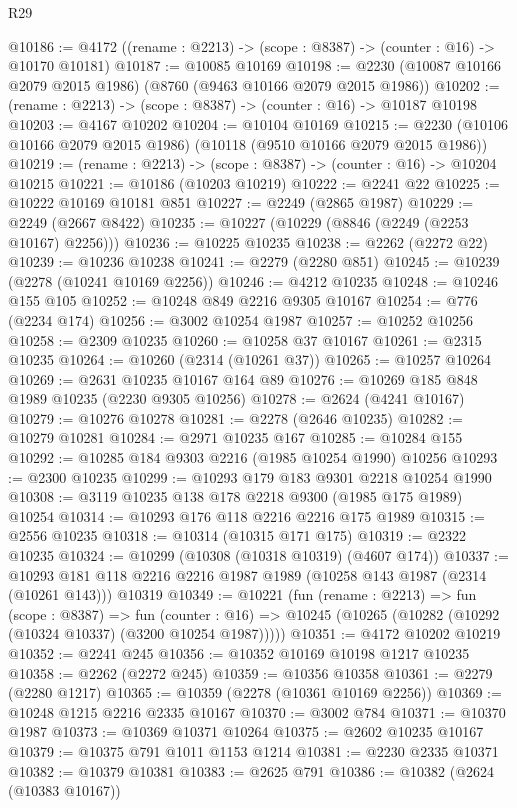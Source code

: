 \begin{lexlean}{R29}
\begin{coremodule}
@10186 := @4172 ((rename : @2213) -> (scope : @8387) -> (counter : @16) -> @10170 @10181)
@10187 := @10085 @10169
@10198 := @2230 (@10087 @10166 @2079 @2015 @1986) (@8760 (@9463 @10166 @2079 @2015 @1986))
@10202 := (rename : @2213) -> (scope : @8387) -> (counter : @16) -> @10187 @10198
@10203 := @4167 @10202
@10204 := @10104 @10169
@10215 := @2230 (@10106 @10166 @2079 @2015 @1986) (@10118 (@9510 @10166 @2079 @2015 @1986))
@10219 := (rename : @2213) -> (scope : @8387) -> (counter : @16) -> @10204 @10215
@10221 := @10186 (@10203 @10219)
@10222 := @2241 @22
@10225 := @10222 @10169 @10181 @851
@10227 := @2249 (@2865 @1987)
@10229 := @2249 (@2667 @8422)
@10235 := @10227 (@10229 (@8846 (@2249 (@2253 @10167) @2256)))
@10236 := @10225 @10235
@10238 := @2262 (@2272 @22)
@10239 := @10236 @10238
@10241 := @2279 (@2280 @851)
@10245 := @10239 (@2278 (@10241 @10169 @2256))
@10246 := @4212 @10235
@10248 := @10246 @155 @105
@10252 := @10248 @849 @2216 @9305 @10167
@10254 := @776 (@2234 @174)
@10256 := @3002 @10254 @1987
@10257 := @10252 @10256
@10258 := @2309 @10235
@10260 := @10258 @37 @10167
@10261 := @2315 @10235
@10264 := @10260 (@2314 (@10261 @37))
@10265 := @10257 @10264
@10269 := @2631 @10235 @10167 @164 @89
@10276 := @10269 @185 @848 @1989 @10235 (@2230 @9305 @10256)
@10278 := @2624 (@4241 @10167)
@10279 := @10276 @10278
@10281 := @2278 (@2646 @10235)
@10282 := @10279 @10281
@10284 := @2971 @10235 @167
@10285 := @10284 @155
@10292 := @10285 @184 @9303 @2216 (@1985 @10254 @1990) @10256
@10293 := @2300 @10235
@10299 := @10293 @179 @183 @9301 @2218 @10254 @1990
@10308 := @3119 @10235 @138 @178 @2218 @9300 (@1985 @175 @1989) @10254
@10314 := @10293 @176 @118 @2216 @2216 @175 @1989
@10315 := @2556 @10235
@10318 := @10314 (@10315 @171 @175)
@10319 := @2322 @10235
@10324 := @10299 (@10308 (@10318 @10319) (@4607 @174))
@10337 := @10293 @181 @118 @2216 @2216 @1987 @1989 (@10258 @143 @1987 (@2314 (@10261 @143))) @10319
@10349 := @10221
    (fun (rename : @2213) =>
    fun (scope : @8387) =>
    fun (counter : @16) => @10245 (@10265 (@10282 (@10292 (@10324 @10337) (@3200 @10254 @1987)))))
@10351 := @4172 @10202 @10219
@10352 := @2241 @245
@10356 := @10352 @10169 @10198 @1217 @10235
@10358 := @2262 (@2272 @245)
@10359 := @10356 @10358
@10361 := @2279 (@2280 @1217)
@10365 := @10359 (@2278 (@10361 @10169 @2256))
@10369 := @10248 @1215 @2216 @2335 @10167
@10370 := @3002 @784
@10371 := @10370 @1987
@10373 := @10369 @10371 @10264
@10375 := @2602 @10235 @10167
@10379 := @10375 @791 @1011 @1153 @1214
@10381 := @2230 @2335 @10371
@10382 := @10379 @10381
@10383 := @2625 @791
@10386 := @10382 (@2624 (@10383 @10167))

\end{coremodule}
\end{lexlean}
